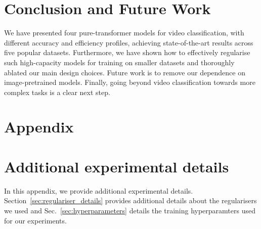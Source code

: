 \documentclass[10pt,twocolumn,letterpaper]{article}
\begin{document}
 \section{Conclusion and Future Work}


We have presented four pure-transformer models for video classification, with different accuracy and efficiency profiles, achieving state-of-the-art results across five popular datasets.
Furthermore, we have shown how to effectively regularise such high-capacity models for training on smaller datasets and thoroughly ablated our main design choices.
Future work is to remove our dependence on image-pretrained models.
Finally, going beyond video classification towards more complex tasks is a clear next step. 
{\small


}

\clearpage
\appendix

\section*{Appendix}
\section{Additional experimental details}

In this appendix, we provide additional experimental details.
Section~\ref{sec:regulariser_details} provides additional details about the regularisers we used and Sec.~\ref{sec:hyperparameters} details the training hyperparamters used for our experiments.
\end{document}
